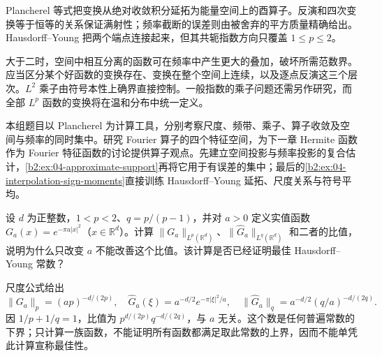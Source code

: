 



\begin{chaptersummary}
Plancherel 等式把变换从绝对收敛积分延拓为能量空间上的酉算子。反演和四次变换等于恒等的关系保证满射性；频率截断的误差则由被舍弃的平方质量精确给出。Hausdorff--Young 把两个端点连接起来，但其共轭指数方向只覆盖 \(1\leq p\leq2\)。

\ProseParagraphBreak

大于二时，空间中相互分离的函数可在频率中产生更大的叠加，破坏所需范数界。应当区分某个好函数的变换存在、变换在整个空间上连续，以及逐点反演这三个层次。\(L^2\) 乘子由符号本性上确界直接控制。一般指数的乘子问题还需另作研究，而全部 \(L^p\) 函数的变换将在温和分布中统一定义。
\end{chaptersummary}

\BookExercises

本组题目以 Plancherel 为计算工具，分别考察尺度、频带、乘子、算子收敛及空间与频率的同时集中。研究 Fourier 算子的四个特征空间，为下一章 Hermite 函数作为 Fourier 特征函数的讨论提供算子观点。先建立空间投影与频率投影的复合估计，\cref{b2:ex:04-approximate-support}再将它用于有误差的集中；最后的\cref{b2:ex:04-interpolation-sign-moments}直接训练 Hausdorff--Young 延拓、尺度关系与符号平均。

\begin{exercise}\label{b2:ex:04-gaussian-ratio}
设 \(d\) 为正整数，\(1<p<2\)、\(q=p/(p-1)\)，并对 \(a>0\) 定义实值函数 \(G_a(x)=e^{-\pi a|x|^2}\)（\(x\in\mathbb R^d\)）。计算 \(\|G_a\|_{L^p(\mathbb R^d)}\)、\(\|\widehat G_a\|_{L^q(\mathbb R^d)}\) 和二者的比值，说明为什么只改变 \(a\) 不能改善这个比值。该计算是否已经证明最佳 Hausdorff--Young 常数？
\end{exercise}
\begin{solution}
尺度公式给出
\[
 \|G_a\|_p=(ap)^{-d/(2p)},\quad
 \widehat G_a(\xi)=a^{-d/2}e^{-\pi|\xi|^2/a},\quad
 \|\widehat G_a\|_q=a^{-d/2}(q/a)^{-d/(2q)}.
\]
因 \(1/p+1/q=1\)，比值为 \(p^{d/(2p)}q^{-d/(2q)}\)，与 \(a\) 无关。这个数是任何普遍常数的下界；只计算一族函数，不能证明所有函数都满足取此常数的上界，因而不能单凭此计算宣称最佳性。
\end{solution}

